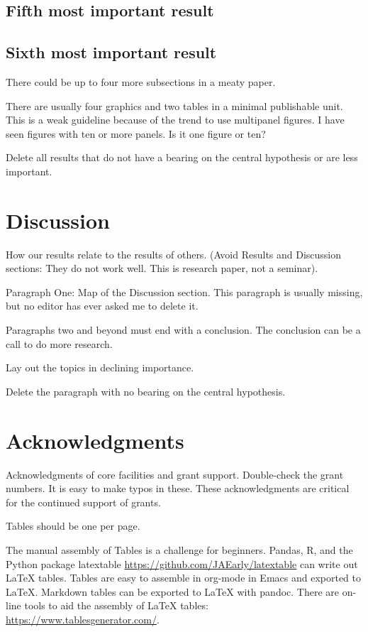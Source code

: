 \documentclass[11pt,letterpaper]{article}
\begin{document}
\subsection*{Fifth most important result}

\subsection*{Sixth most important result}

There could be up to four more subsections in a meaty paper.

There are usually four graphics and two tables in a minimal publishable unit.
This is a weak guideline because of the trend to use multipanel figures.
I have seen figures with ten or more panels.
Is it one figure or ten?

Delete all results that do not have a bearing on the central hypothesis or are less important.

\section*{Discussion}
How our results relate to the results of others.
(Avoid Results and Discussion sections: They do not work well. This is research paper, not a seminar).

Paragraph One: Map of the Discussion section. 
This paragraph is usually missing, but no editor has ever asked me to delete it.

Paragraphs two and beyond must end with a conclusion.
The conclusion can be a call to do more research.

Lay out the topics in declining importance.

Delete the paragraph with no bearing on the central hypothesis.


\section*{Acknowledgments}

Acknowledgments of core facilities and grant support. 
Double-check the grant numbers.
It is easy to make typos in these.
These acknowledgments are critical for the continued support of grants.




\newpage
\listoftables
Tables should be one per page. 

The manual assembly of Tables is a challenge for beginners. 
Pandas, R, and the Python package latextable \url{https://github.com/JAEarly/latextable} can write out LaTeX tables. 
Tables are easy to assemble in org-mode in Emacs and exported to LaTeX. 
Markdown tables can be exported to LaTeX with pandoc. 
There are on-line tools to aid the assembly of LaTeX tables: \url{https://www.tablesgenerator.com/}.
\end{document}
